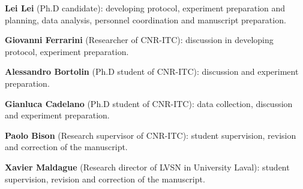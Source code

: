 \textbf{\textsf{Lei Lei}} (Ph.D candidate): developing protocol, experiment preparation and planning, data analysis,  personnel coordination and manuscript preparation.

\textbf{Giovanni Ferrarini} (Researcher of CNR-ITC): discussion in developing protocol, experiment preparation.

\textbf{Alessandro Bortolin} (Ph.D student of CNR-ITC): discussion and experiment preparation.

\textbf{Gianluca Cadelano} (Ph.D student of CNR-ITC): data collection, discussion and experiment preparation.

\textbf{Paolo Bison} (Research supervisor of CNR-ITC): student supervision, revision and correction of the manuscript. 

\textbf{Xavier Maldague} (Research director of LVSN in University Laval): student supervision, revision and correction of the manuscript.



